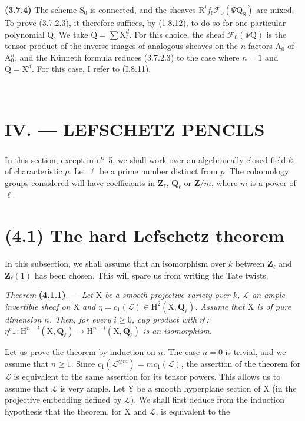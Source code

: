 \documentclass[11pt,leqno]{article}
\newcommand{\Page}[1]{\ifvmode\noindent\else\unskip\ \fi{\footnotesize\textcolor{gray}{[p.\,#1]}}\ \ignorespaces}
\begin{document}
\textbf{(3.7.4)} The scheme \(\mathrm S_0\) is connected, and the sheaves \(\mathrm R^if_!\mathscr F_0(\Psi\mathrm Q_{\mathrm S})\) are mixed. To prove (3.7.2.3), it therefore suffices, by (1.8.12), to do so for one particular polynomial \(\mathrm Q\). We take \(\mathrm Q=\sum\mathrm X_i^d\). For this choice, the sheaf \(\mathscr F_0(\Psi\mathrm Q)\) is the tensor product of the inverse images of analogous sheaves on the \(n\) factors \(\mathrm A_0^1\) of \(\mathrm A_0^n\), and the Künneth formula reduces (3.7.2.3) to the case where \(n=1\) and \(\mathrm Q=\mathrm X^d\). For this case, I refer to (I.8.11).

\Page{217}
\section*{IV. — LEFSCHETZ PENCILS}

In this section, except in n\textsuperscript{o}~5, we shall work over an algebraically closed field \(k\), of characteristic \(p\). Let \(\ell\) be a prime number distinct from \(p\). The cohomology groups considered will have coefficients in \(\mathbf{Z}_\ell\), \(\mathbf{Q}_\ell\) or \(\mathbf{Z}/m\), where \(m\) is a power of \(\ell\).

\section*{(4.1) The hard Lefschetz theorem}

In this subsection, we shall assume that an isomorphism over \(k\) between \(\mathbf{Z}_\ell\) and \(\mathbf{Z}_\ell(1)\) has been chosen. This will spare us from writing the Tate twists.

\textit{Theorem} \textbf{(4.1.1)}. — \textit{Let \(\mathrm{X}\) be a smooth projective variety over \(k\), \(\mathscr{L}\) an ample invertible sheaf on \(\mathrm{X}\) and \(\eta=c_1(\mathscr{L})\in\mathrm{H}^2(\mathrm{X},\mathbf{Q}_\ell)\). Assume that \(\mathrm{X}\) is of pure dimension \(n\). Then, for every \(i\geq0\), cup product with \(\eta^i\): \(\eta^i\cup:\mathrm{H}^{n-i}(\mathrm{X},\mathbf{Q}_\ell)\to\mathrm{H}^{n+i}(\mathrm{X},\mathbf{Q}_\ell)\) is an isomorphism.}

Let us prove the theorem by induction on \(n\). The case \(n=0\) is trivial, and we assume that \(n\geq1\). Since \(c_1(\mathscr{L}^{\otimes m})=mc_1(\mathscr{L})\), the assertion of the theorem for \(\mathscr{L}\) is equivalent to the same assertion for its tensor powers. This allows us to assume that \(\mathscr{L}\) is very ample. Let \(\mathrm{Y}\) be a smooth hyperplane section of \(\mathrm{X}\) (in the projective embedding defined by \(\mathscr{L}\)). We shall first deduce from the induction hypothesis that the theorem, for \(\mathrm{X}\) and \(\mathscr{L}\), is equivalent to the
\end{document}
